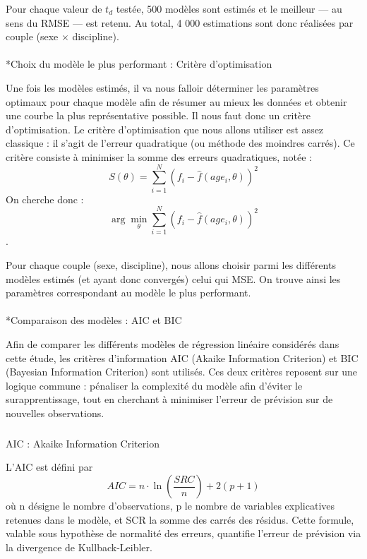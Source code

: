\documentclass[
  french,
  11pt,
  a4paper,
]{article}
\makeatletter
\let\oldparagraph\paragraph
\renewcommand{\paragraph}{
    \@ifstar
      \xxxParagraphStar
      \xxxParagraphNoStar
  }
\newcommand{\xxxParagraphStar}[1]{\oldparagraph*{#1}\mbox{}}
\newcommand{\xxxParagraphNoStar}[1]{\oldparagraph{#1}\mbox{}}
\let\oldsubparagraph\subparagraph
\renewcommand{\subparagraph}{
    \@ifstar
      \xxxSubParagraphStar
      \xxxSubParagraphNoStar
  }
\newcommand{\xxxSubParagraphStar}[1]{\oldsubparagraph*{#1}\mbox{}}
\newcommand{\xxxSubParagraphNoStar}[1]{\oldsubparagraph{#1}\mbox{}}
\makeatother
\begin{document}
Pour chaque valeur de \(t_d\) testée, 500 modèles sont estimés et le
meilleur --- au sens du RMSE --- est retenu. Au total, 4 000 estimations
sont donc réalisées par couple (sexe \(\times\) discipline).

\paragraph*{Choix du modèle le plus performant : Critère
d'optimisation}\label{choix-du-moduxe8le-le-plus-performant-crituxe8re-doptimisation}

Une fois les modèles estimés, il va nous falloir déterminer les
paramètres optimaux pour chaque modèle afin de résumer au mieux les
données et obtenir une courbe la plus représentative possible. Il nous
faut donc un critère d'optimisation. Le critère d'optimisation que nous
allons utiliser est assez classique : il s'agit de l'erreur quadratique
(ou méthode des moindres carrés). Ce critère consiste à minimiser la
somme des erreurs quadratiques, notée :
\[S(\theta) = \sum_{i=1}^{N} (f_i - \hat{f}(age_i, \theta))^2\] On
cherche donc :
\[\arg\min_{\theta} \sum_{i=1}^{N} (f_i - \hat{f}(age_i, \theta))^2\].

Pour chaque couple (sexe, discipline), nous allons choisir parmi les
différents modèles estimés (et ayant donc convergés) celui qui MSE. On
trouve ainsi les paramètres correspondant au modèle le plus performant.

\paragraph*{Comparaison des modèles : AIC et
BIC}\label{comparaison-des-moduxe8les-aic-et-bic}

Afin de comparer les différents modèles de régression linéaire
considérés dans cette étude, les critères d'information AIC (Akaike
Information Criterion) et BIC (Bayesian Information Criterion) sont
utilisés. Ces deux critères reposent sur une logique commune : pénaliser
la complexité du modèle afin d'éviter le surapprentissage, tout en
cherchant à minimiser l'erreur de prévision sur de nouvelles
observations.

\subparagraph{AIC : Akaike Information
Criterion}\label{aic-akaike-information-criterion}

L'AIC est défini par \[AIC=n \cdot \ln(\frac {SRC} n)+2(p+1)\] où n
désigne le nombre d'observations, p le nombre de variables explicatives
retenues dans le modèle, et SCR la somme des carrés des résidus. Cette
formule, valable sous hypothèse de normalité des erreurs, quantifie
l'erreur de prévision via la divergence de Kullback-Leibler.
\end{document}
